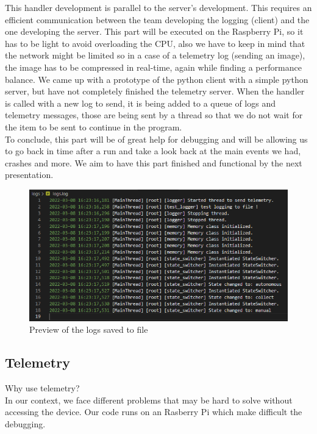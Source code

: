 \documentclass[12pt]{article}
\begin{document}
This handler development is parallel to the server's development. This requires an efficient communication between the team developing the logging (client) and the one developing the server. This part will be executed on the Raspberry Pi, so it has to be light to avoid overloading the CPU, also we have to keep in mind that the network might be limited so in a case of a telemetry log (sending an image), the image has to be compressed in real-time, again while finding a performance balance.
We came up with a prototype of the python client with a simple python server, but have not completely finished the telemetry server. When the handler is called with a new log to send, it is being added to a queue of logs and telemetry messages, those are being sent by a thread so that we do not wait for the item to be sent to continue in the program. \\
To conclude, this part will be of great help for debugging and will be allowing us to go back in time after a run and take a look back at the main events we had, crashes and more. We aim to have this part finished and functional by the next presentation.

\begin{figure}[h!]
    \includegraphics[width=\textwidth]{../../docs/logs.png}
    \caption{Preview of the logs saved to file}
    \label{fig:logs}
\end{figure}

\newpage 

\subsection{Telemetry}
Why use telemetry? \\

In our context, we face different problems that may be hard to solve without accessing the device. Our code runs on an Rasberry Pi which make difficult the debugging.\\
\end{document}
